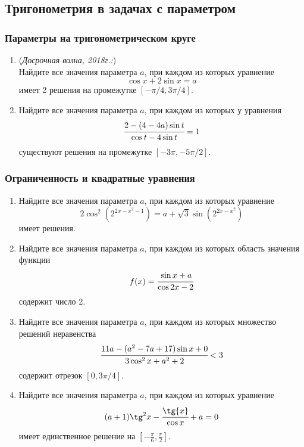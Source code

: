 \documentclass[12pt]{article}
\begin{document}





\subsection{Тригонометрия в задачах с параметром}

\subsubsection*{Параметры на тригонометрическом круге}
 \begin{enumerate}[start=1,label={\itshape\bfseries \arabic*.}]
    \item (\textit{Досрочная волна, 2018г.:})\\
    Найдите все значения параметра $a$, при каждом из которых уравнение
    $$\cos{x} + 2\sin{x} = a$$
    имеет 2 решения на промежутке $[- \pi / 4, 3\pi / 4]$.
    \item Найдите все значения параметра $a$, при каждом из которых у уравнения
    $$\cfrac{2 - (4 - 4a)\sin{t}}{\cos{t} - 4\sin{t}} = 1$$
    существуют решения на промежутке $[-3\pi, -5\pi / 2]$.
\end{enumerate}
\subsubsection*{Ограниченность и квадратные уравнения}
 \begin{enumerate}[start=1,label={\itshape\bfseries \arabic*.}]
    \item Найдите все значения параметра $a$, при каждом из которых уравнение
    $$ 2\cos^2{(2^{2x - x^2 - 1})} = a + \sqrt{3}\sin{(2^{2x - x^2})}$$
    имеет решения.
    \item Найдите все значения параметра $a$, при каждом из которых область значения функции
    $$f(x) = \cfrac{\sin{x} + a}{\cos{2x} - 2}$$
    содержит число 2.
    \item Найдите все значения параметра $a$, при каждом из которых множество решений неравенства
    $$\cfrac{11a - (a^2 - 7a + 17)\sin{x} + 0}{3\cos^2{x} + a^2 + 2} < 3$$
    содержит отрезок $[0, 3\pi / 4]$.
    \item Найдите все значения параметра $a$, при каждом из которых уравнение
    $$(a + 1)\tg^2{x} - \cfrac{\tg{x}}{\cos{x}} + a = 0$$
    имеет единственное решение на $[-\frac{\pi}{6}, \frac{\pi}{2}]$.
\end{enumerate}
\end{document}
